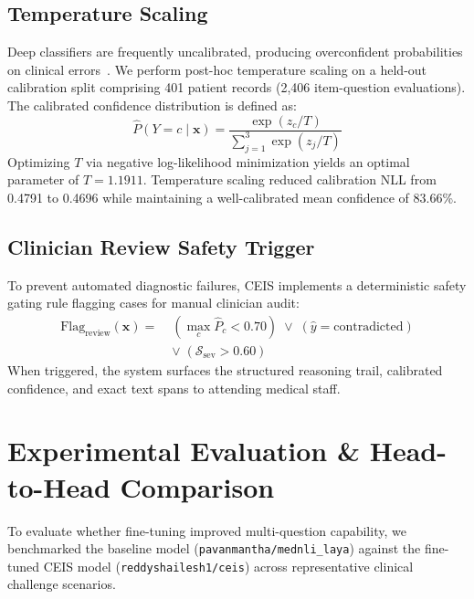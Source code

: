 \documentclass[10pt,conference]{IEEEtran}
\begin{document}
\subsection{Temperature Scaling}
Deep classifiers are frequently uncalibrated, producing overconfident probabilities on clinical errors~\cite{guo2017calibration}. We perform post-hoc temperature scaling on a held-out calibration split comprising 401 patient records (2,406 item-question evaluations). The calibrated confidence distribution is defined as:
\begin{equation}
\hat{P}(Y = c \mid \mathbf{x}) = \frac{\exp(z_c / T)}{\sum_{j=1}^3 \exp(z_j / T)}
\end{equation}
Optimizing $T$ via negative log-likelihood minimization yields an optimal parameter of \textbf{$T = 1.1911$}. Temperature scaling reduced calibration NLL from 0.4791 to 0.4696 while maintaining a well-calibrated mean confidence of 83.66\%.

\subsection{Clinician Review Safety Trigger}
To prevent automated diagnostic failures, CEIS implements a deterministic safety gating rule flagging cases for manual clinician audit:
\begin{equation}
\begin{aligned}
\text{Flag}_{\text{review}}(\mathbf{x}) = \;&\left(\max_{c} \hat{P}_c < 0.70\right) \;\lor\; (\hat{y} = \text{contradicted}) \\
&\lor\; (\mathcal{S}_{\text{sev}} > 0.60)
\end{aligned}
\end{equation}
When triggered, the system surfaces the structured reasoning trail, calibrated confidence, and exact text spans to attending medical staff.

\section{Experimental Evaluation \& Head-to-Head Comparison}
To evaluate whether fine-tuning improved multi-question capability, we benchmarked the baseline model (\texttt{pavanmantha/mednli\_laya}) against the fine-tuned CEIS model (\texttt{reddyshailesh1/ceis}) across representative clinical challenge scenarios.
\end{document}
